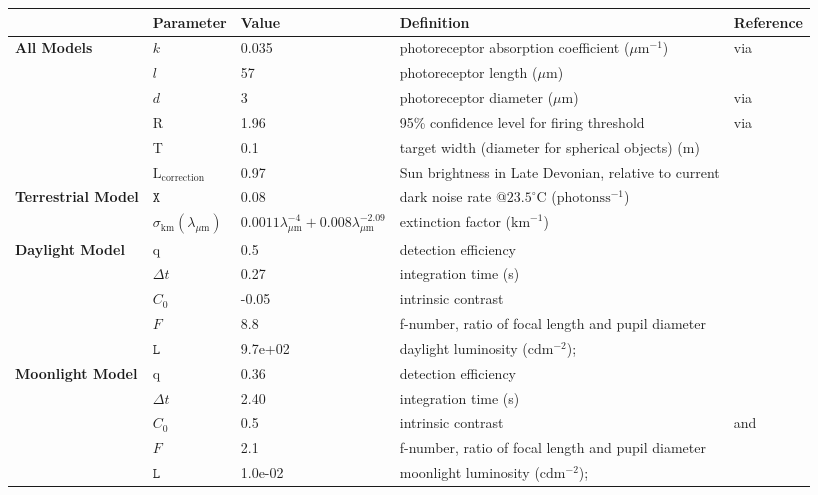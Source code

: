 \begin{tabular}{|L{3.5cm}|L{2cm}|L{2cm}|L{4.5cm}|L{4.5cm}|}
\hline
\textbf{ }&\textbf{Parameter}&\textbf{Value}&\textbf{Definition}&\textbf{Reference}\\\hline
\textbf{All Models}&$k$&0.035&photoreceptor absorption coefficient ($\mu \text{m}^{-1}$)&\cite{Part90a} via \cite{Warr98a}\\\hline
 &$l$&57&photoreceptor length ($\mu \text{m}$)&\cite{Nils14a}\\\hline
 &$d$&3&photoreceptor diameter ($\mu \text{m}$)&\cite{Land12a} via \cite{Nils14a}\\\hline
 &R&1.96&95\% confidence level for firing threshold&\cite{Land81a} via \cite{Nils14a}\\\hline
 &T&0.1&target width (diameter for spherical objects) (m)& \\\hline
 &$\text{L}_{\text{correction}}$&0.97&Sun brightness in Late Devonian, relative to current&\cite{Bahc01a}\\\hline
\textbf{Terrestrial Model}&$\mathtt{X}$&0.08&dark noise rate @$23.5^{\circ} \text{C}$ ($\text{photons} \text{s}^{-1}$)&\cite{Aho93a}\\\hline
 &$\sigma_{\text{km}} (\lambda_{\mu \text{m}})$&$0.0011 \lambda_{\mu \text{m}}^{-4} + 0.008 \lambda_{\mu \text{m}}^{-2.09}$&extinction factor ($\text{km}^{-1}$)&\cite{Midd52a}\\\hline
\textbf{Daylight Model}&q&0.5&detection efficiency&\cite{Pirh07a}\\\hline
 &$\Delta t$&0.27&integration time (s)&\cite{Donn95a}\\\hline
 &$C_{0}$&-0.05&intrinsic contrast&\cite{Hest68a}\\\hline
 &$F$&8.8&f-number, ratio of focal length and pupil diameter&\cite{Mill79a}\\\hline
 &$\mathtt{L}$&9.7e+02&daylight luminosity ($\text{cd} \text{m}^{-2}$);&\cite{Midd52a}\\\hline
\textbf{Moonlight Model}&q&0.36&detection efficiency&\cite{Nils14a}\\\hline
 &$\Delta t$&2.40&integration time (s)&\cite{Donn95a}\\\hline
 &$C_{0}$&0.5&intrinsic contrast&\cite{Hest68a} and \cite{Blac46a}\\\hline
 &$F$&2.1&f-number, ratio of focal length and pupil diameter&\cite{Mill79a}\\\hline
 &$\mathtt{L}$&1.0e-02&moonlight luminosity ($\text{cd} \text{m}^{-2}$);&\cite{Midd52a}\\\hline

\end{tabular}
